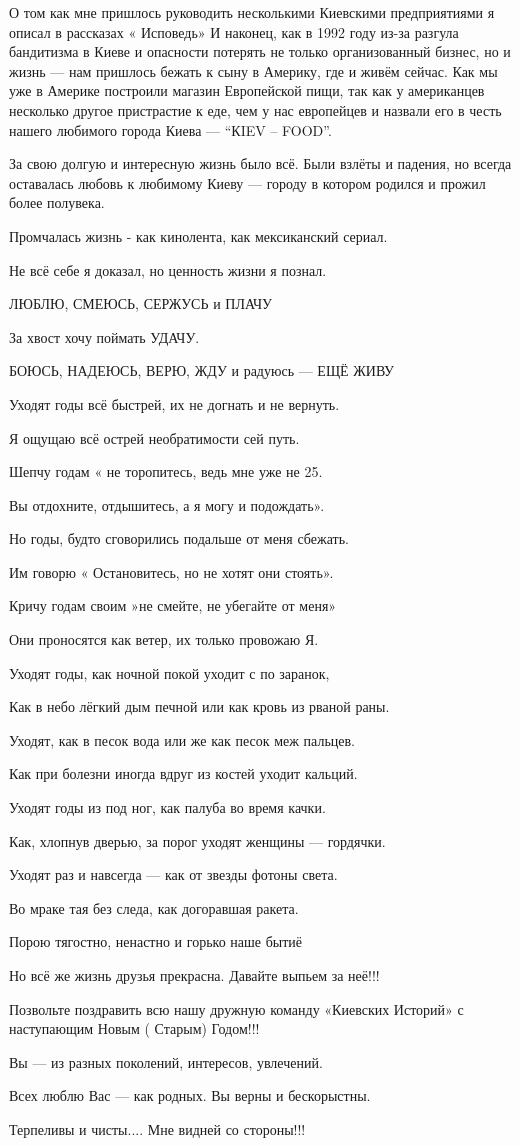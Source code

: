 О том как мне пришлось руководить несколькими Киевскими  предприятиями я описал
в рассказах « Исповедь» И наконец, как в 1992 году из-за разгула бандитизма в
Киеве и опасности потерять не только  организованный бизнес, но и жизнь — нам
пришлось бежать к сыну в Америку, где и живём сейчас. Как мы уже в Америке
построили магазин  Европейской  пищи, так как у американцев несколько другое
пристрастие к еде, чем у нас европейцев  и назвали его в честь нашего любимого
города  Киева — \enquote{КIEV – FOOD}.                                        

За свою долгую и интересную жизнь было всё. Были взлёты и падения, но всегда
оставалась любовь к любимому Киеву — городу в котором родился и прожил более
полувека.

Промчалась жизнь - как кинолента, как мексиканский сериал.

Не всё себе я доказал, но ценность жизни я познал.

ЛЮБЛЮ, СМЕЮСЬ, СЕРЖУСЬ и ПЛАЧУ

За хвост хочу поймать УДАЧУ.

БОЮСЬ, НАДЕЮСЬ, ВЕРЮ, ЖДУ и радуюсь — ЕЩЁ ЖИВУ

Уходят годы всё быстрей, их не догнать и не вернуть.

Я ощущаю всё острей необратимости сей путь.

Шепчу годам « не торопитесь, ведь мне уже не 25.

Вы отдохните, отдышитесь, а я могу и подождать».

Но годы, будто сговорились подальше от меня сбежать.

Им говорю « Остановитесь, но не хотят они стоять».

Кричу годам своим »не смейте, не убегайте от меня»

Они проносятся как ветер, их только провожаю Я.

Уходят годы, как ночной покой уходит с по заранок,

Как в небо лёгкий дым печной или как кровь из рваной раны.

Уходят, как в песок вода или же как песок меж пальцев.

Как при болезни иногда вдруг из костей уходит кальций.

Уходят годы из под ног, как палуба во время качки.

Как, хлопнув дверью, за порог уходят женщины — гордячки.

Уходят раз и навсегда — как от звезды фотоны света.

Во мраке тая без следа, как догоравшая  ракета.

Порою тягостно, ненастно и горько наше бытиё

Но всё же жизнь друзья прекрасна. Давайте выпьем за неё!!!

Позвольте поздравить всю нашу дружную команду «Киевских Историй» с наступающим
Новым  ( Старым) Годом!!!

Вы — из разных поколений, интересов, увлечений. 

Всех люблю Вас — как родных. Вы верны и бескорыстны.

Терпеливы и чисты.... Мне видней со стороны!!!
